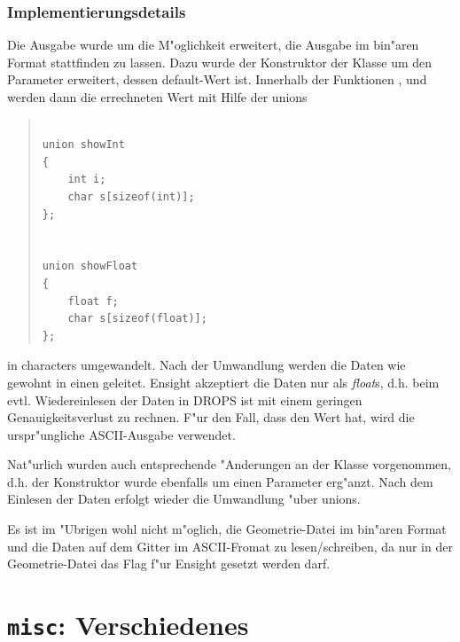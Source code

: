\documentclass[11pt,a4paper]{article}
\newenvironment{Code}{\begin{quote}\scriptsize}{\end{quote}}
\begin{document}
\subsubsection{Implementierungsdetails}

Die Ausgabe  wurde um die M"oglichkeit erweitert, die Ausgabe im 
bin"aren Format stattfinden zu lassen. Dazu wurde der Konstruktor der Klasse
um den Parameter  erweitert, dessen default-Wert  ist.
Innerhalb der Funktionen ,  und   
werden dann die errechneten Wert mit Hilfe der unions
\begin{Code}
\begin{verbatim}

union showInt
{
    int i;
    char s[sizeof(int)];
};


union showFloat
{
    float f;
    char s[sizeof(float)];
};

\end{verbatim}
\end{Code}
in characters umgewandelt. 
Nach der Umwandlung werden die Daten wie gewohnt in einen  geleitet.
Ensight akzeptiert die Daten nur als \textit{float}s, d.h. beim evtl. Wiedereinlesen 
der Daten in DROPS ist mit einem geringen Genauigkeitsverlust zu rechnen. F"ur den Fall, dass
 den Wert  hat, wird die urspr"ungliche ASCII-Ausgabe verwendet. 

Nat"urlich wurden auch entsprechende "Anderungen an der Klasse 
vorgenommen, d.h. der Konstruktor wurde ebenfalls um einen Parameter  erg"anzt.
Nach dem Einlesen der Daten erfolgt wieder die Umwandlung "uber unions.

Es ist im "Ubrigen wohl nicht m"oglich, die Geometrie-Datei im bin"aren Format und die Daten
auf dem Gitter im ASCII-Fromat zu lesen/schreiben, da nur in der Geometrie-Datei das Flag 
 f"ur Ensight gesetzt werden darf.


\section{{\tt misc}: Verschiedenes}
\end{document}
